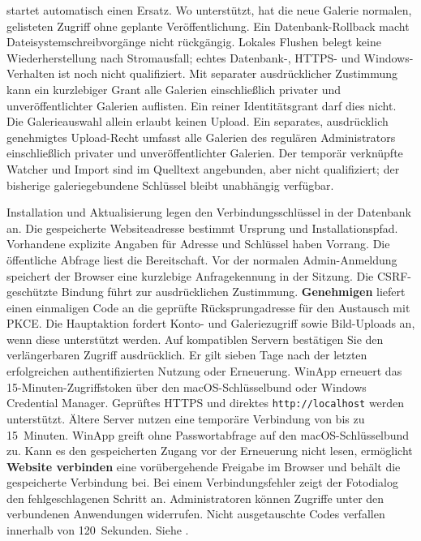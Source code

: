 \documentclass[11pt,a4paper]{article}
\newcommand{\filepath}[1]{\path{#1}}
\newcommand{\ui}[1]{\textbf{#1}}
\begin{document}
startet automatisch einen Ersatz. Wo unterstützt, hat
die neue Galerie normalen, gelisteten Zugriff ohne geplante Veröffentlichung.
Ein Datenbank-Rollback macht Dateisystemschreibvorgänge nicht rückgängig.
Lokales Flushen belegt keine Wiederherstellung nach Stromausfall; echtes
Datenbank-, HTTPS- und Windows-Verhalten ist noch nicht qualifiziert.
Mit separater ausdrücklicher Zustimmung kann
ein kurzlebiger Grant alle Galerien einschließlich privater und
unveröffentlichter Galerien auflisten. Ein reiner Identitätsgrant darf dies
nicht. Die Galerieauswahl allein erlaubt keinen Upload. Ein separates,
ausdrücklich genehmigtes Upload-Recht umfasst alle Galerien des regulären
Administrators einschließlich privater und unveröffentlichter Galerien. Der
temporär verknüpfte Watcher und Import sind im Quelltext angebunden, aber nicht
qualifiziert; der bisherige galeriegebundene Schlüssel bleibt unabhängig
verfügbar.

Installation und Aktualisierung legen den Verbindungsschlüssel in der
Datenbank an. Die gespeicherte Websiteadresse bestimmt Ursprung und
Installationspfad. Vorhandene explizite Angaben für Adresse und Schlüssel
haben Vorrang. Die öffentliche Abfrage liest die Bereitschaft. Vor der
normalen Admin-Anmeldung speichert der Browser eine kurzlebige Anfragekennung
in der Sitzung. Die CSRF-geschützte Bindung führt zur ausdrücklichen Zustimmung.
\ui{Genehmigen} liefert einen einmaligen Code an die geprüfte Rücksprungadresse
für den Austausch mit PKCE. Die Hauptaktion fordert Konto- und Galeriezugriff sowie Bild-Uploads an,
wenn diese unterstützt werden. Auf kompatiblen Servern bestätigen Sie den
verlängerbaren Zugriff ausdrücklich. Er gilt sieben Tage nach der letzten
erfolgreichen authentifizierten Nutzung oder Erneuerung. WinApp erneuert das
15-Minuten-Zugriffstoken über den macOS-Schlüsselbund oder Windows Credential
Manager. Geprüftes HTTPS und direktes \texttt{http://localhost} werden
unterstützt. Ältere Server nutzen eine temporäre Verbindung von bis zu
15~Minuten.
WinApp greift ohne Passwortabfrage auf den macOS-Schlüsselbund zu. Kann es
den gespeicherten Zugang vor der Erneuerung nicht lesen, ermöglicht
\ui{Website verbinden} eine vorübergehende Freigabe im Browser und behält
die gespeicherte Verbindung bei.
Bei einem Verbindungsfehler zeigt der Fotodialog den fehlgeschlagenen Schritt an.
Administratoren können Zugriffe unter den verbundenen Anwendungen widerrufen.
Nicht ausgetauschte Codes verfallen innerhalb von 120~Sekunden. Siehe
\filepath{docs/APP_LINKING_PHASE_0.md}.
\end{document}
